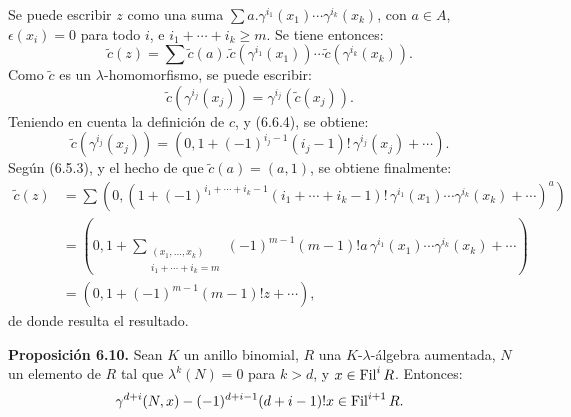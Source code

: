 Se puede escribir \(z\) como una suma \(\sum a.\gamma^{i_1}(x_1)\cdots\gamma^{i_k}(x_k)\), con \(a\in A\), \(\epsilon(x_i)=0\) para todo \(i\), e \(i_1+\cdots+i_k\ge m\). Se tiene entonces:
\[
  \widetilde c(z)=
  \sum \widetilde c(a).
        \widetilde c(\gamma^{i_1}(x_1))\cdots
        \widetilde c(\gamma^{i_k}(x_k)).
\]
Como \(\widetilde c\) es un \(\lambda\)-homomorfismo, se puede escribir:
\[
  \widetilde c(\gamma^{i_j}(x_j))=\gamma^{i_j}(\widetilde c(x_j)).
\]
Teniendo en cuenta la definición de \(c\), y (6.6.4), se obtiene:
\[
  \widetilde c(\gamma^{i_j}(x_j))
  =
  \left(0,1+(-1)^{i_j-1}(i_j-1)!\,\gamma^{i_j}(x_j)+\cdots\right).
\]
Según (6.5.3), y el hecho de que \(\widetilde c(a)=(a,1)\), se obtiene finalmente:
\[
\begin{aligned}
\widetilde c(z)
&=\sum
\left(0,\left(1+
(-1)^{i_1+\cdots+i_k-1}
(i_1+\cdots+i_k-1)!
\,\gamma^{i_1}(x_1)\cdots\gamma^{i_k}(x_k)
+\cdots\right)^a\right)\\
&=
\left(0,1+
\sum_{\substack{(x_1,\ldots,x_k)\\ i_1+\cdots+i_k=m}}
(-1)^{m-1}(m-1)!a\,\gamma^{i_1}(x_1)\cdots\gamma^{i_k}(x_k)
+\cdots\right)\\
&=
(0,1+(-1)^{m-1}(m-1)!z+\cdots),
\end{aligned}
\]
de donde resulta el resultado.

\textbf{Proposición 6.10.} Sean \(K\) un anillo binomial, \(R\) una \(K\)-\(\lambda\)-álgebra aumentada, \(N\) un elemento de \(R\) tal que \(\lambda^k(N)=0\) para \(k>d\), y \(x\in\operatorname{Fil}^iR\). Entonces:
\[
  \gamma^{d+i}(N,x)-(-1)^{d+i-1}(d+i-1)!x\in\operatorname{Fil}^{i+1}R.
\]
